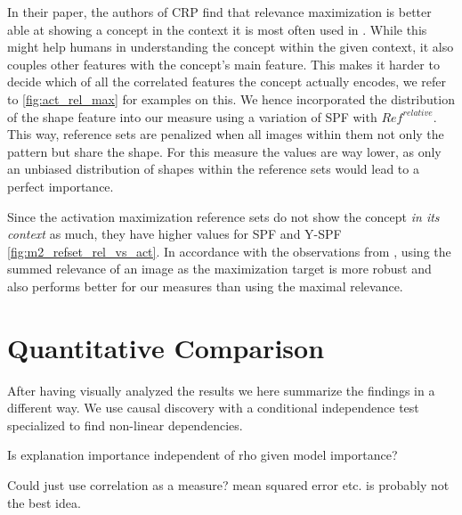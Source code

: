 In their paper, the authors of CRP find that relevance maximization is better able at showing a concept in the context it is most often used in \citep{Achtibat2022}.
While this might help humans in understanding the concept within the given context, it also couples other features with the concept's main feature. This makes it harder to decide which of all the correlated features the concept actually encodes, we refer to \cref{fig:act_rel_max} for examples on this.
We hence incorporated the distribution of the shape feature into our measure using a variation of SPF with $Ref^{relative}$.
This way, reference sets are penalized when all images within them not only the pattern but share the shape. 
For this measure the values are way lower, as only an unbiased distribution of shapes within the reference sets would lead to a perfect importance.

Since the activation maximization reference sets do not show the concept \textit{in its context} as much, they have higher values for SPF and Y-SPF \cref{fig:m2_refset_rel_vs_act}. 
In accordance with the observations from \cite{Achtibat2022}, using the summed relevance of an image as the maximization target is more robust and also performs better for our measures than using the maximal relevance. 

\section{Quantitative Comparison}
After having visually analyzed the results we here summarize the findings in a different way. We use causal discovery with a conditional independence test specialized to find non-linear dependencies. 

Is explanation importance independent of rho given model importance?


Could just use correlation as a measure? mean squared error etc. is probably not the best idea.




